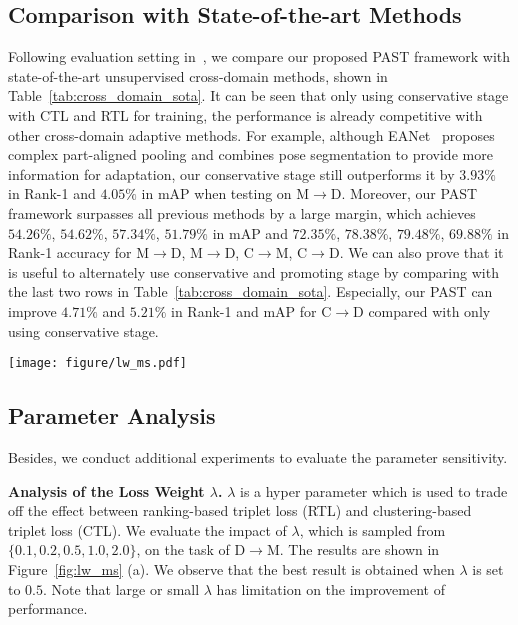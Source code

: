 \documentclass[10pt,twocolumn,letterpaper]{article}
\begin{document}
\subsection{Comparison with State-of-the-art Methods}
Following evaluation setting in~\cite{EANet, HHL}, we compare our proposed PAST framework with state-of-the-art unsupervised cross-domain methods, shown in Table~\ref{tab:cross_domain_sota}.
It can be seen that only using conservative stage with CTL and RTL for training, the performance is already competitive with other cross-domain adaptive methods. 
For example, although EANet~\cite{EANet} proposes complex part-aligned pooling and combines pose segmentation to provide more information for adaptation, our conservative stage still outperforms it by $3.93\%$ in Rank-1 and $4.05\%$ in mAP when testing on M$\rightarrow$D. 
Moreover, our PAST framework surpasses all previous methods by a large margin, which achieves $54.26\%$, $54.62\%$, $57.34\%$, $51.79\%$ in mAP and $72.35\%$, $78.38\%$, $79.48\%$, $69.88\%$ in Rank-1 accuracy for M$\rightarrow$D, M$\rightarrow$D, C$\rightarrow$M, C$\rightarrow$D. 
We can also prove that it is useful to alternately use conservative and promoting stage by comparing with the last two rows in Table~\ref{tab:cross_domain_sota}. 
Especially, our PAST can improve $4.71\%$ and $5.21\%$ in Rank-1 and mAP for C$\rightarrow$D compared with only using conservative stage.

\begin{figure*}[h]
\centering
\texttt{[image: figure/lw\_ms.pdf]}
\setlength{\abovecaptionskip}{-0.35cm} 
\setlength{\belowcaptionskip}{-0.6cm}
\caption{Analysis of hyper parameters on D$\rightarrow$M setting. (a): The impact of the loss weight $\lambda$; (b): The impact of the minimum samples $S_{\min}$ at each cluster in HDBSCAN clustering method; (c): The number of clusters from HDBSCAN with different minimum sample $S_{\min}$.}
\label{fig:lw_ms}
\end{figure*}

\subsection{Parameter Analysis}
Besides, we conduct additional experiments to evaluate the parameter sensitivity.

\textbf{Analysis of the Loss Weight $\lambda$.}
$\lambda$ is a hyper parameter which is used to trade off the effect between ranking-based triplet loss (RTL) and clustering-based triplet loss (CTL). 
We evaluate the impact of $\lambda$, which is sampled from $\lbrace 0.1, 0.2, 0.5, 1.0, 2.0 \rbrace$, on the task of D$\rightarrow$M. 
The results are shown in Figure~\ref{fig:lw_ms} (a). 
We observe that the best result is obtained when $\lambda$ is set to $0.5$. Note that large or small $\lambda$ has limitation on the improvement of performance.
\end{document}
